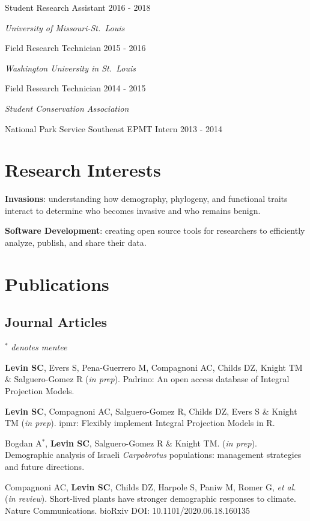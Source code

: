 \documentclass[11pt,]{article}
\begin{document}
Student Research Assistant \hfill 2016 - 2018

\emph{University of Missouri-St.~Louis}

Field Research Technician \hfill 2015 - 2016

\emph{Washington University in St.~Louis}

Field Research Technician \hfill 2014 - 2015

\emph{Student Conservation Association}

National Park Service Southeast EPMT Intern \hfill 2013 - 2014

\hypertarget{research-interests}{%
\section{Research Interests}\label{research-interests}}

\textbf{Invasions}: understanding how demography, phylogeny, and
functional traits interact to determine who becomes invasive and who
remains benign.

\textbf{Software Development}: creating open source tools for
researchers to efficiently analyze, publish, and share their data.

\hypertarget{publications}{%
\section{Publications}\label{publications}}

\hypertarget{journal-articles}{%
\subsection{Journal Articles}\label{journal-articles}}

\(^\ast\) \emph{denotes mentee}

\textbf{Levin SC}, Evers S, Pena-Guerrero M, Compagnoni AC, Childs DZ,
Knight TM \& Salguero-Gomez R (\emph{in prep}). Padrino: An open access
database of Integral Projection Models.

\textbf{Levin SC}, Compagnoni AC, Salguero-Gomez R, Childs DZ, Evers S
\& Knight TM (\emph{in prep}). ipmr: Flexibly implement Integral
Projection Models in R.

Bogdan A\(^\ast\), \textbf{Levin SC}, Salguero-Gomez R \& Knight TM.
(\emph{in prep}). Demographic analysis of Israeli \emph{Carpobrotus}
populations: management strategies and future directions.

Compagnoni AC, \textbf{Levin SC}, Childs DZ, Harpole S, Paniw M, Romer
G, \emph{et al.} (\emph{in review}). Short-lived plants have stronger
demographic responses to climate. Nature Communications. bioRxiv DOI:
10.1101/2020.06.18.160135
\end{document}
